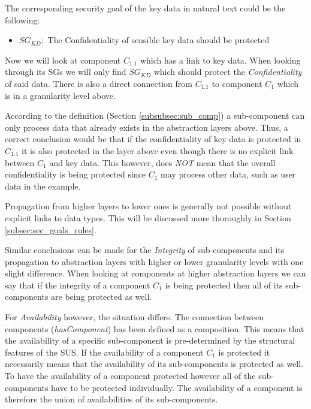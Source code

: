 The corresponding security goal of the key data in natural text could be the following:

\begin{itemize}
\item[]\textbf{$SG_{KD}:$} The Confidentiality of sensible key data should be protected
\end{itemize}

Now we will look at component $C_{1.1}$ which has a link to key data. When looking through its SGs we will only find $SG_{KD}$ which should protect the \textit{Confidentiality} of said data. There is also a direct connection from $C_{1.1}$ to component $C_1$ which is in a granularity level above. 

According to the definition (Section \ref{subsubsec:sub_comp}) a sub-component can only process data that already exists in the abstraction layers above. Thus, a correct conclusion would be that if the confidentiality of key data is protected in $C_{1.1}$ it is also protected in the layer above even though there is no explicit link between $C_1$ and key data. This however, does \textit{NOT} mean that the overall confidentiality is being protected since $C_1$ may process other data, such 
as user data in the example.

Propagation from higher layers to lower ones is generally not possible without explicit links to data types. This will be discussed more thoroughly in Section \ref{subsec:sec_goals_rules}.

Similar conclusions can be made for the \textit{Integrity} of sub-components and its propagation to abstraction layers with higher or lower granularity levels with one slight difference. When looking at components at higher abstraction layers we can say that if the integrity of a component $C_1$ is being protected then all of its sub-components are being protected as well. 

For \textit{Availability} however, the situation differs. The connection between components (\textit{hasComponent}) has been defined as a composition. This means that the availability of a specific sub-component is pre-determined by the structural features of the SUS. If the availability of a component $C_1$ is protected it necessarily means that the availability of its sub-components is protected as well. To have the availability of a component protected however all of the sub-components have to be protected individually. The availability of a component is therefore the union of availabilities of its sub-components.

